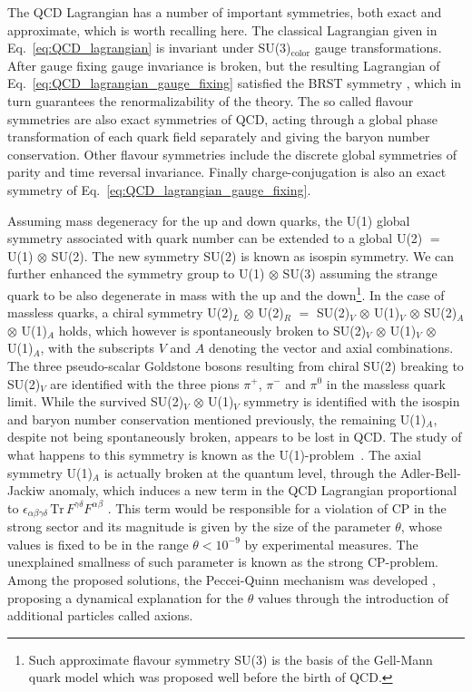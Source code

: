 The QCD Lagrangian has a number of important symmetries, both exact and approximate,
which is worth recalling here.
The classical Lagrangian given in Eq.~\eqref{eq:QCD_lagrangian} is invariant under SU(3)$_{\text{color}}$
gauge transformations. After gauge fixing gauge invariance is broken, but the resulting Lagrangian of 
Eq.~\eqref{eq:QCD_lagrangian_gauge_fixing} satisfied the BRST symmetry \cite{Becchi:1975nq, Tyutin:1975qk},
which in turn guarantees the renormalizability of the theory.
The so called flavour symmetries are also exact symmetries of QCD, 
acting through a global phase transformation of each quark field separately and giving
the baryon number conservation. 
Other flavour symmetries include the discrete global symmetries of parity and time reversal invariance.
Finally charge-conjugation is also an exact symmetry of Eq.~\eqref{eq:QCD_lagrangian_gauge_fixing}. 

Assuming mass degeneracy for the up and down quarks, the U(1) global symmetry associated with quark number 
can be extended to a global U(2) $=$ U(1) $\otimes$ SU(2). The new symmetry SU(2) is known as isospin symmetry.
We can further enhanced the symmetry group to U(1) $\otimes$ SU(3) assuming the strange quark to be also 
degenerate in mass with the up and the down\footnote{Such approximate flavour symmetry SU(3) is the basis of the Gell-Mann
quark model \cite{GellMann:1964nj} which was proposed well before the birth of QCD.}.
In the case of massless quarks, a chiral symmetry
U(2)$_{L}$ $\otimes$ U(2)$_R$ $=$ SU(2)$_V$ $\otimes$ U(1)$_V$ $\otimes$  SU(2)$_A$ $\otimes$ U(1)$_A$ 
holds, which however is spontaneously broken to SU(2)$_V$ $\otimes$ U(1)$_V$ $\otimes$ U(1)$_A$,
with the subscripts $V$ and $A$ denoting the vector and axial combinations.
The three pseudo-scalar Goldstone bosons resulting from chiral SU(2) breaking 
to SU(2)$_V$ are identified with the three pions $\pi^+$, $\pi^-$ and $\pi^0$
in the massless quark limit. 
While the survived SU(2)$_V$ $\otimes$ U(1)$_V$ symmetry is identified with the isospin and baryon number 
conservation mentioned previously, the remaining U(1)$_A$, despite not being spontaneously broken,
appears to be lost in QCD. The study of what happens to this symmetry is known as the U(1)-problem~\cite{Weinberg:1975ui}.
The axial symmetry U(1)$_A$ is actually broken at the quantum level, through the Adler-Bell-Jackiw anomaly,
which induces a new term in the QCD Lagrangian proportional to 
$\epsilon_{\alpha\beta\gamma\delta}\, \text{Tr}\, F^{\gamma\delta} F^{\alpha\beta}$ .
This term would be responsible for a violation of CP in the strong sector and 
its magnitude is given by the size of the parameter $\theta$, whose values is fixed to be in the range
$\theta<10^{-9}$ by experimental measures. The unexplained smallness of such parameter is known as the strong CP-problem.
Among the proposed solutions, the Peccei-Quinn mechanism was developed \cite{Peccei:1977ur}, proposing a dynamical explanation
for the $\theta$ values through the introduction of additional particles called axions. 

